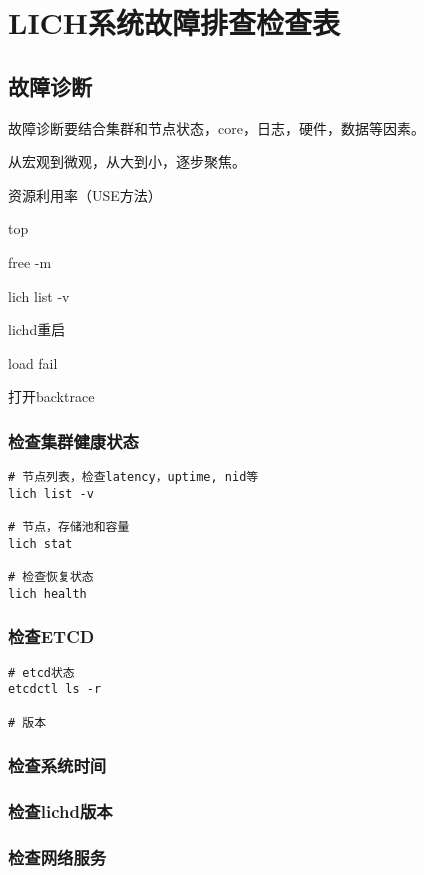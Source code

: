\chapter{LICH系统故障排查检查表}

\section{故障诊断}

故障诊断要结合集群和节点状态，core，日志，硬件，数据等因素。

从宏观到微观，从大到小，逐步聚焦。

资源利用率（USE方法）

top

free -m

lich list -v

lichd重启

load fail

打开backtrace

\subsection{检查集群健康状态}

\begin{lstlisting}
# 节点列表，检查latency，uptime, nid等
lich list -v

# 节点，存储池和容量
lich stat

# 检查恢复状态
lich health
\end{lstlisting}

\subsection{检查ETCD}

\begin{lstlisting}
# etcd状态
etcdctl ls -r

# 版本
\end{lstlisting}

\subsection{检查系统时间}

\subsection{检查lichd版本}

\subsection{检查网络服务}

